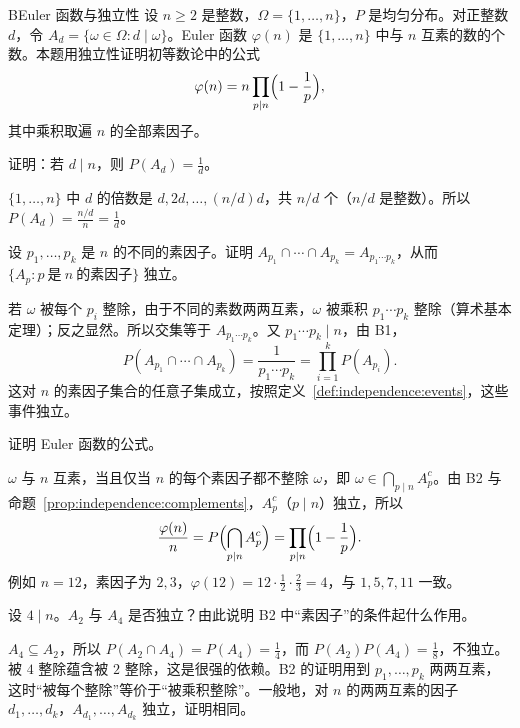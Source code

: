 \begin{probleme}{B}{Euler 函数与独立性}
设 $n\geqslant2$ 是整数，$\Omega=\{1,\dots,n\}$，$P$ 是均匀分布。对正整数 $d$，令 $A_d=\{\omega\in\Omega:d\mid\omega\}$。Euler 函数 $\varphi(n)$ 是 $\{1,\dots,n\}$ 中与 $n$ 互素的数的个数。本题用独立性证明初等数论中的公式
\[
\varphi(n)=n\prod_{p\mid n}\Bigl(1-\frac1p\Bigr),
\]
其中乘积取遍 $n$ 的全部素因子。
\begin{questions}
\item 证明：若 $d\mid n$，则 $P(A_d)=\frac1d$。
\begin{solution}
$\{1,\dots,n\}$ 中 $d$ 的倍数是 $d,2d,\dots,(n/d)d$，共 $n/d$ 个（$n/d$ 是整数）。所以 $P(A_d)=\frac{n/d}n=\frac1d$。
\end{solution}

\item 设 $p_1,\dots,p_k$ 是 $n$ 的不同的素因子。证明 $A_{p_1}\cap\cdots\cap A_{p_k}=A_{p_1\cdots p_k}$，从而 $\{A_p:p\ \text{是}\ n\ \text{的素因子}\}$ 独立。
\begin{solution}
若 $\omega$ 被每个 $p_i$ 整除，由于不同的素数两两互素，$\omega$ 被乘积 $p_1\cdots p_k$ 整除（算术基本定理）；反之显然。所以交集等于 $A_{p_1\cdots p_k}$。又 $p_1\cdots p_k\mid n$，由 B1，
\[
P(A_{p_1}\cap\cdots\cap A_{p_k})=\frac1{p_1\cdots p_k}=\prod_{i=1}^kP(A_{p_i}).
\]
这对 $n$ 的素因子集合的任意子集成立，按照定义~\ref{def:independence:events}，这些事件独立。
\end{solution}

\item 证明 Euler 函数的公式。
\begin{solution}
$\omega$ 与 $n$ 互素，当且仅当 $n$ 的每个素因子都不整除 $\omega$，即 $\omega\in\bigcap_{p\mid n}A_p^c$。由 B2 与命题~\ref{prop:independence:complements}，$A_p^c$（$p\mid n$）独立，所以
\[
\frac{\varphi(n)}n=P\Bigl(\bigcap_{p\mid n}A_p^c\Bigr)=\prod_{p\mid n}\Bigl(1-\frac1p\Bigr).
\]
例如 $n=12$，素因子为 $2,3$，$\varphi(12)=12\cdot\frac12\cdot\frac23=4$，与 $1,5,7,11$ 一致。
\end{solution}

\item 设 $4\mid n$。$A_2$ 与 $A_4$ 是否独立？由此说明 B2 中“素因子”的条件起什么作用。
\begin{solution}
$A_4\subseteq A_2$，所以 $P(A_2\cap A_4)=P(A_4)=\frac14$，而 $P(A_2)P(A_4)=\frac18$，不独立。被 $4$ 整除蕴含被 $2$ 整除，这是很强的依赖。B2 的证明用到 $p_1,\dots,p_k$ 两两互素，这时“被每个整除”等价于“被乘积整除”。一般地，对 $n$ 的两两互素的因子 $d_1,\dots,d_k$，$A_{d_1},\dots,A_{d_k}$ 独立，证明相同。
\end{solution}
\end{questions}
\end{probleme}

